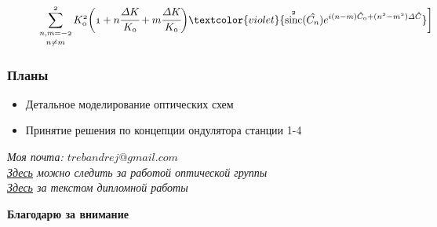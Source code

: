 \documentclass[14pt, hyperref = {colorlinks}]{beamer}
\DeclareMathOperator{\sinc}{sinc}
\begin{document}
\begin{frame}
\begin{figure}[h]
	$\mathnormal{\displaystyle\mathop{\sum\limits_{n, m =-2}^{2}}_{n \neq m}K^2_0\bigg(1 + n\cfrac{\Delta K}{K_0} + m\cfrac{\Delta K}{K_0}\bigg)
	\textcolor{violet}{\sinc^2(\hat{C_n})e^{i(n-m)\hat{C}_0 + (n^2 - m^2)\Delta \hat{C}}}\bigg]}$
\end{figure}
\end{frame}

\small
\begin{frame}
\frametitle{Планы}\label{t1}
\begin{center}
	\begin{itemize}
		\item Детальное моделирование оптических схем
		\item Принятие решения по концепции ондулятора станции 1-4	
	\end{itemize}
\end{center}
{\textit{Моя почта: $trebandrej@gmail.com$}}\\
{\textit{\href{https://github.com/TrebAndrew/thesis_andrei.git}{Здесь} можно следить за работой оптической группы}}\\
{\textit{\href{https://github.com/TrebAndrew/diploma.git}{Здесь} за текстом дипломной работы}}\\
\end{frame}

\begin{frame}
\begin{center}
	\textbf{Благодарю за внимание}
\end{center}
\end{frame}
\end{document}
